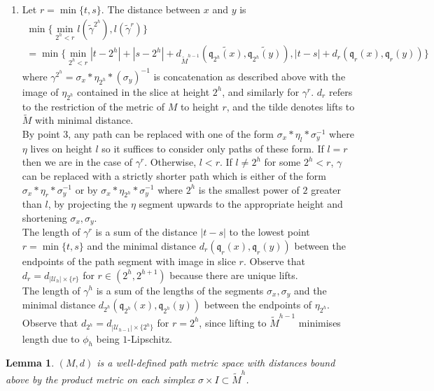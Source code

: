 \documentclass[a4paper,11pt]{article}
\theoremstyle{definition}
\theoremstyle{plain}
\newtheorem{lemma}[definition]{Lemma}
\theoremstyle{remark}
\begin{document}
{\begin{enumerate}
\item Let $r=\min\{t,s\}$. The distance between $x$ and $y$ is
\begin{align*}
\min \{\min_{2^h<r} l(\tilde{\gamma}^{2^h}), l(\tilde{\gamma}^{r})\} \\
= \min \{\min_{2^h<r} |t-2^h|+|s-2^h| + d_{\tilde{M}^{h-1}}(\widetilde{\mathfrak{q}_{2^h}(x)}, \widetilde{\mathfrak{q}_{2^h}(y)}), |t-s| + d_{r}(\mathfrak{q}_{r}(x), \mathfrak{q}_{r}(y))\}
\end{align*}
where $\gamma^{2^h}=\sigma_{x}\ast \eta_{2^h} \ast (\sigma_{y})^{-1}$ is concatenation as described above with the image of $\eta_{2^h}$ contained in the slice at height $2^h$, and similarly for $\gamma^r$. $d_{r}$ refers to the restriction of the metric of $M$ to height $r$, and the tilde denotes lifts to $\tilde{M}$ with minimal distance.\\

By point $3$, any path can be replaced with one of the form $\sigma_{x}\ast \eta_{l} \ast \sigma_{y}^{-1}$ where $\eta$ lives on height $l$ so it suffices to consider only paths of these form. If $l=r$ then we are in the case of $\gamma^r$. Otherwise, $l<r$. If $l\neq 2^h$ for some $2^h<r$, $\gamma$ can be replaced with a strictly shorter path which is either of the form $\sigma_{x}\ast \eta_{r} \ast \sigma_{y}^{-1}$ or by $\sigma_{x}\ast \eta_{2^h} \ast \sigma_{y}^{-1}$ where $2^h$ is the smallest power of $2$ greater than $l$, by projecting the $\eta$ segment upwards to the appropriate height and shortening $\sigma_{x},\sigma_{y}$.\\

The length of $\gamma^r$ is a sum of the distance $|t-s|$ to the lowest point $r=\min\{t,s\}$ and the minimal distance $d_{r}(\mathfrak{q}_{r}(x),\mathfrak{q}_{r}(y))$ between the endpoints of the path segment with image in slice $r$. Observe that $d_{r}= d_{|\mathcal{U}_{h}| \times \{r\}}$ for $r\in (2^h,2^{h+1})$ because there are unique lifts. \\

The length of $\gamma^h$ is a sum of the lengths of the segments $\sigma_x, \sigma_y$ and the minimal distance $d_{2^h}(\mathfrak{q}_{2^h}(x),\mathfrak{q}_{2^h}(y))$ between the endpoints of $\eta_{2^h}$. Observe that $d_{2^h} = d_{|\mathcal{U}_{h-1}| \times \{2^h\}}$ for $r=2^h$, since lifting to $\tilde{M}^{h-1}$ minimises length due to $\phi_{h}$ being $1$-Lipschitz.
\end{enumerate}

\begin{lemma} $(M,d)$ is a well-defined path metric space with distances bound above by the product metric on each simplex $\sigma \times I \subset \tilde{M}^{h}$.
\end{lemma}

}
\end{document}
